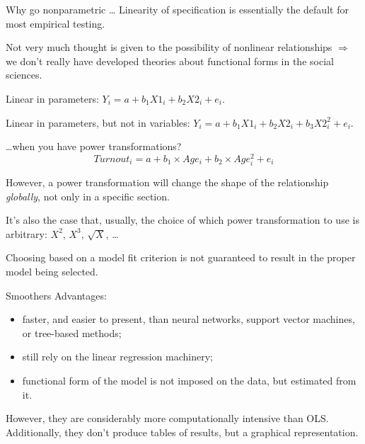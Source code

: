 \documentclass[12pt,english,pdf,xcolor=dvipsnames,aspectratio=169,handout]{beamer}\usepackage[]{graphicx}\usepackage[]{xcolor}
\begin{document}
\begin{frame}{Why go nonparametric \dots}
Linearity of specification is essentially the default for most empirical testing.\bigskip

Not very much thought is given to the possibility of nonlinear relationships $\Rightarrow$ we don't really have developed theories about functional forms in the social sciences.\bigskip

Linear in parameters: $Y_i = a + b_1X1_i + b_2X2_i + e_i$.\bigskip

Linear in parameters, but not in variables: $Y_i = a + b_1X1_i + b_2X2_i + b_3X2_i^2 + e_i$.

\end{frame}



\begin{frame}{\dots when you have power transformations?}
\begin{equation}
Turnout_i = a + b_1\times Age_i + b_2\times Age_i^2 + e_i
\end{equation}

However, a power transformation will change the shape of the relationship \textit{globally}, not only in a specific section.\bigskip

It's also the case that, usually, the choice of which power transformation to use is arbitrary: $X^2$, $X^3$, $\sqrt{X}$, \dots \bigskip

Choosing based on a model fit criterion is not guaranteed to result in the proper model being selected.

\end{frame}


\begin{frame}{Smoothers}
Advantages:

\begin{itemize}
\item faster, and easier to present, than neural networks, support vector machines, or tree-based methods;
\item still rely on the linear regression machinery;
\item functional form of the model is not imposed on the data, but estimated from it.
\end{itemize}\bigskip

However, they are considerably more computationally intensive than OLS. Additionally, they don't produce tables of results, but a graphical representation.

\end{frame}
\end{document}
